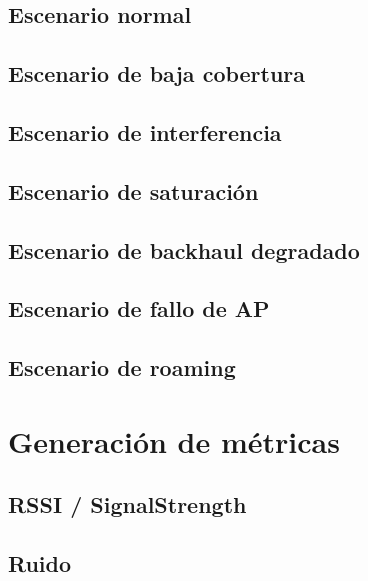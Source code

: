 \subsection{Escenario normal}
\label{subsec:escenario-normal}

\subsection{Escenario de baja cobertura}
\label{subsec:escenario-baja-cobertura}

\subsection{Escenario de interferencia}
\label{subsec:escenario-interferencia}

\subsection{Escenario de saturación}
\label{subsec:escenario-saturacion}

\subsection{Escenario de backhaul degradado}
\label{subsec:escenario-backhaul-degradado}

\subsection{Escenario de fallo de AP}
\label{subsec:escenario-fallo-ap}

\subsection{Escenario de roaming}
\label{subsec:escenario-roaming}


\section{Generación de métricas}
\label{sec:generacion-metricas}

\subsection{RSSI / SignalStrength}
\label{subsec:rssi-signalstrength}

\subsection{Ruido}
\label{subsec:ruido}


